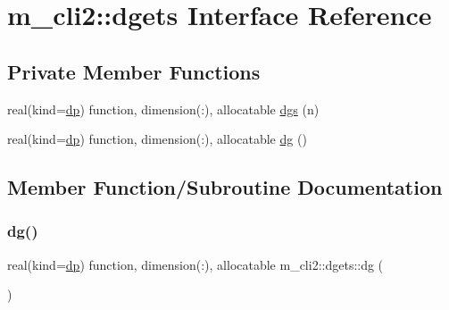 \hypertarget{interfacem__cli2_1_1dgets}{}\section{m\+\_\+cli2\+:\+:dgets Interface Reference}
\label{interfacem__cli2_1_1dgets}
\subsection*{Private Member Functions}
\begin{DoxyCompactItemize}
\item 
real(kind=\mbox{\hyperlink{namespacem__cli2_acf83f1963cf6a56ad0221cfcf5402440}{dp}}) function, dimension(\+:), allocatable \mbox{\hyperlink{interfacem__cli2_1_1dgets_ab9c8964aca8338a18962fd3d41fbb6ab}{dgs}} (n)
\item 
real(kind=\mbox{\hyperlink{namespacem__cli2_acf83f1963cf6a56ad0221cfcf5402440}{dp}}) function, dimension(\+:), allocatable \mbox{\hyperlink{interfacem__cli2_1_1dgets_a17a17f7d3b8802c89a94e7b167454a54}{dg}} ()
\end{DoxyCompactItemize}


\subsection{Member Function/\+Subroutine Documentation}
\mbox{\label{interfacem__cli2_1_1dgets_a17a17f7d3b8802c89a94e7b167454a54}} 
\subsubsection{\texorpdfstring{dg()}{dg()}}
{\footnotesize\ttfamily real(kind=\mbox{\hyperlink{namespacem__cli2_acf83f1963cf6a56ad0221cfcf5402440}{dp}}) function, dimension(\+:), allocatable m\+\_\+cli2\+::dgets\+::dg (\begin{DoxyParamCaption}{ }\end{DoxyParamCaption})\hspace{0.3cm}{\ttfamily [private]}}

\mbox{\label{interfacem__cli2_1_1dgets_ab9c8964aca8338a18962fd3d41fbb6ab}} 
